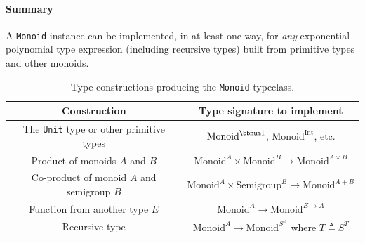 \paragraph{Summary}

A \lstinline!Monoid! instance can be implemented, in at least one
way, for \emph{any} exponential-polynomial type
expression (including recursive types) built from primitive types
and other monoids.%

\begin{table}
\begin{centering}
\begin{tabular}{|c|c|}
\hline 
\textbf{\footnotesize{}Construction} & \textbf{\footnotesize{}Type signature to implement}\tabularnewline
\hline 
\hline 
{\footnotesize{}The }\lstinline!Unit!{\footnotesize{} type or other
primitive types} & {\footnotesize{}$\text{Monoid}^{\bbnum 1}$, $\text{Monoid}^{\text{Int}}$,
etc.}\tabularnewline
\hline 
{\footnotesize{}Product of monoids $A$ and $B$} & {\footnotesize{}$\text{Monoid}^{A}\times\text{Monoid}^{B}\rightarrow\text{Monoid}^{A\times B}$}\tabularnewline
\hline 
{\footnotesize{}Co-product of monoid $A$ and semigroup $B$} & {\footnotesize{}$\text{Monoid}^{A}\times\text{Semigroup}^{B}\rightarrow\text{Monoid}^{A+B}$}\tabularnewline
\hline 
{\footnotesize{}Function from another type $E$} & {\footnotesize{}$\text{Monoid}^{A}\rightarrow\text{Monoid}^{E\rightarrow A}$}\tabularnewline
\hline 
{\footnotesize{}Recursive type} & {\footnotesize{}$\text{Monoid}^{A}\rightarrow\text{Monoid}^{S^{A}}$
where $T\triangleq S^{T}$}\tabularnewline
\hline 
\end{tabular}
\par\end{centering}
\caption{Type constructions producing the \lstinline!Monoid! typeclass.\label{tab:Type-constructions-for-monoid}}
\end{table}


